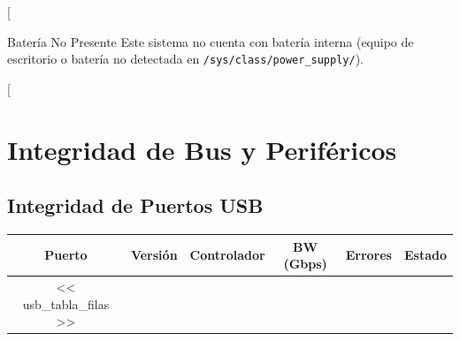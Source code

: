 \documentclass[11pt, a4paper, final]{article}
\newcommand{\thcell}[1]{\color{AMPrimary}\textbf{#1}}
\begin{document}
[%
\begin{amboxinfo}{Batería No Presente}
  \scriptsize Este sistema no cuenta con batería interna (equipo de escritorio o batería no detectada en \texttt{/sys/class/power\_supply/}).
\end{amboxinfo}
[%

\newpage


\section{Integridad de Bus y Periféricos}


\subsection{Integridad de Puertos USB}

\begin{tabularx}{\linewidth}{@{} c c X c c c @{}}
  \toprule
  \thcell{Puerto} & \thcell{Versión} & \thcell{Controlador} &
  \thcell{BW (Gbps)} & \thcell{Errores} & \thcell{Estado} \\
  \midrule
  << usb_tabla_filas >>
  \bottomrule
\end{tabularx}

\vspace{0.5cm}
\end{document}
